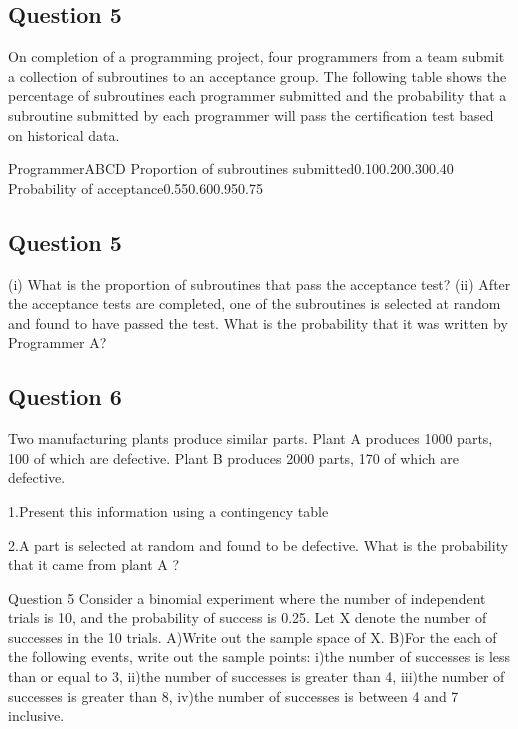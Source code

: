 
\subsection{Question 5}

On completion of a programming project, four programmers from a team submit a collection of subroutines to an acceptance group. The following table shows the percentage of subroutines each programmer submitted and the probability that a subroutine submitted by each programmer will pass the certification test based on historical data.

ProgrammerABCD
Proportion of subroutines submitted0.100.200.300.40
Probability of acceptance0.550.600.950.75




\subsection{Question 5}
(i) What is the proportion of subroutines that pass the acceptance test?
(ii) After the acceptance tests are completed, one of the subroutines is selected at random and found to have passed the test. What is the probability that it was written by Programmer A?






\subsection{Question 6}
Two manufacturing plants produce similar parts. Plant A produces 1000 parts, 100 of which are defective. Plant B produces 2000 parts, 170 of which are defective. 

1.Present this information using a contingency table

2.A part is selected at random and found to be defective. What is the probability that it came from plant A ?









Question 5
Consider a binomial experiment where the number of independent trials is 10, and the probability of success is 0.25. Let X denote the number of successes in the 10 trials.
A)Write out the sample space of X.
B)For the each of the following events, write out the sample points:
i)the number of successes is less than or equal to 3,
ii)the number of successes is greater than 4, 
iii)the number of successes is greater than 8, 
iv)the number of successes is between 4 and 7 inclusive.


